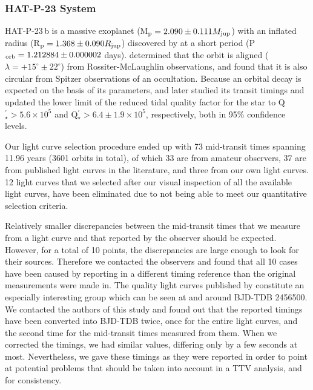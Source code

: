 \documentclass[a4paper,fleqn,usenatbib]{mnras}
\begin{document}
\subsubsection{HAT-P-23 System}
\label{sec:ttv_HATP23}
HAT-P-23\,b is a massive exoplanet (M$_{\rm p} = 2.090 \pm 0.111 M_{\rm jup}$) with an inflated radius (R$_{\rm p} = 1.368 \pm 0.090 R_{\rm jup}$) discovered by \cite{2011ApJ...742..116B} at a short period (P$_{\rm orb} = 1.212884 \pm 0.000002$ days). \citet{2011A&A...533A.113M} determined that the orbit is aligned ($\lambda = +15^{\circ} \pm 22^{\circ}$) from Rossiter-McLaughlin observations, and \cite{2014ApJ...781..109O} found that it is also circular from Spitzer observations of an occultation. Because an orbital decay is expected on the basis of its parameters, \citet{2018AcA....68..371M} and later \citet{2020AJ....159..150P} studied its transit timings and updated the lower limit of the reduced tidal quality factor for the star to Q$_{\star}^{\prime} > 5.6 \times 10^{5}$ and Q$_{\star}^{\prime} > 6.4 \pm 1.9 \times 10^5$, respectively, both in 95\% confidence levels. 

Our light curve selection procedure ended up with 73 mid-transit times spanning 11.96 years (3601 orbits in total), of which 33 are from amateur observers, 37 are from published light curves in the literature, and three from our own light curves. 12 light curves that we selected after our visual inspection of all the available light curves, have been eliminated due to not being able to meet our quantitative selection criteria. 

Relatively smaller discrepancies between the mid-transit times that we measure from a light curve and that reported by the observer should be expected. However, for a total of 10 points, the discrepancies are large enough to look for their sources. Therefore we contacted the observers and found that all 10 cases have been caused by reporting in a different timing reference than the original measurements were made in. The quality light curves published by \citet{2015A&A...577A..54C} constitute an especially interesting group which can be seen at and around BJD-TDB 2456500. We contacted the authors of this study and found out that the reported timings have been converted into BJD-TDB twice, once for the entire light curves, and the second time for the mid-transit times measured from them. When we corrected the timings, we had similar values, differing only by a few seconds at most. Nevertheless, we gave these timings as they were reported in order to point at potential problems that should be taken into account in a TTV analysis, and for consistency.
\end{document}
